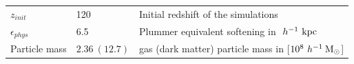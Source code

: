 \documentclass[aspectratio=43]{beamer}
\newcommand{\hMsun}{~h^{-1}\>{\rm M_\odot}}
\newcommand{\Mpc}{~h^{-1}~{\rm Mpc}}
\newcommand{\Kpc}{~h^{-1}~{\rm kpc}}
\begin{document}
\begin{frame}
\begin{itemize}
{\begin{table}
\begin{tabular}{lll}
          $z_{init}$ & 120 & Initial redshift of the simulations \\
          $\epsilon_{phys}$ & 6.5 & Plummer equivalent softening in $\Kpc$ \\
          Particle mass & $2.36 \ (12.7) $ & gas (dark matter) particle mass in [$10^8 \hMsun$]\\
          \hline
        \end{tabular}
      \end{table}}
\end{itemize}
\end{frame}
\end{document}
